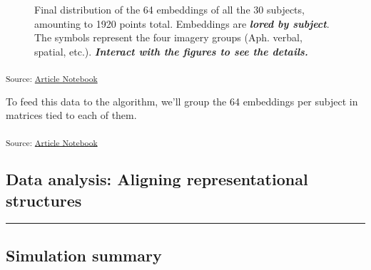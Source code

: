 \documentclass[
  authoryear]{elsarticle}
\begin{document}
\label{cell-fig-subject-embeddings-b}
\begin{figure}[H]


\caption{\label{fig-subject-embeddings-b}Final distribution of the 64
embeddings of all the 30 subjects, amounting to 1920 points total.
Embeddings are \textbf{\emph{lored by subject}}. The symbols represent
the four imagery groups (Aph. verbal, spatial, etc.).
\textbf{\emph{Interact with the figures to see the details.}}}

\end{figure}%

\textsubscript{Source:
\href{https://m-delem.github.io/2499-similarity-manuscript/index.qmd.html}{Article
Notebook}}

To feed this data to the algorithm, we'll group the 64 embeddings per
subject in matrices tied to each of them.

\textsubscript{Source:
\href{https://m-delem.github.io/2499-similarity-manuscript/index.qmd.html}{Article
Notebook}}

\subsection{Data analysis: Aligning representational
structures}\label{data-analysis-aligning-representational-structures}

\begin{center}\rule{0.5\linewidth}{0.5pt}\end{center}

\subsection{Simulation summary}\label{simulation-summary}
\end{document}
